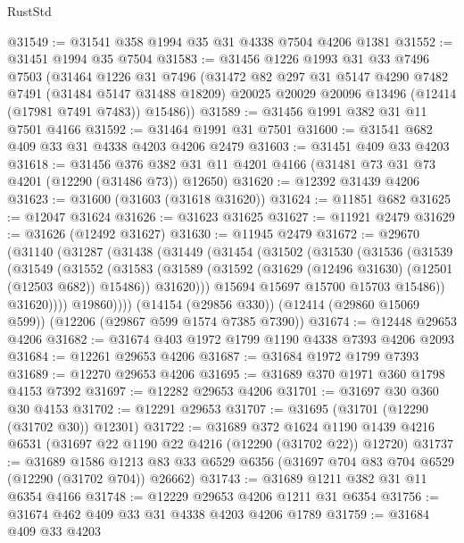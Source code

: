 \begin{lexlean}{RustStd}
\begin{coremodule}
{\begin{coremodule}
{{{{{{{{{{{{{{{{{{{{{{{{{{{{{{{{{{{{{{{{{{{{{{{{{{@31549 := @31541 @358 @1994 @35 @31 @4338 @7504 @4206 @1381
@31552 := @31451 @1994 @35 @7504
@31583 := @31456
    @1226
    @1993
    @31
    @33
    @7496
    @7503
    (@31464
      @1226
      @31
      @7496
      (@31472
        @82
        @297
        @31
        @5147
        @4290
        @7482
        @7491
        (@31484 @5147 @31488 @18209)
        @20025
        @20029
        @20096
        @13496
        (@12414 (@17981 @7491 @7483))
        @15486))
@31589 := @31456 @1991 @382 @31 @11 @7501 @4166
@31592 := @31464 @1991 @31 @7501
@31600 := @31541 @682 @409 @33 @31 @4338 @4203 @4206 @2479
@31603 := @31451 @409 @33 @4203
@31618 := @31456
    @376
    @382
    @31
    @11
    @4201
    @4166
    (@31481 @73 @31 @73 @4201 (@12290 (@31486 @73)) @12650)
@31620 := @12392 @31439 @4206
@31623 := @31600 (@31603 (@31618 @31620))
@31624 := @11851 @682
@31625 := @12047 @31624
@31626 := @31623 @31625
@31627 := @11921 @2479
@31629 := @31626 (@12492 @31627)
@31630 := @11945 @2479
@31672 := @29670
    (@31140
      (@31287
        (@31438
          (@31449
            (@31454
              (@31502
                (@31530
                  (@31536
                    (@31539
                      (@31549
                        (@31552
                          (@31583
                            (@31589
                              (@31592 (@31629 (@12496 @31630) (@12501 (@12503 @682)) @15486))
                              @31620)))
                        @15694
                        @15697
                        @15700
                        @15703
                        @15486))
                    @31620))))
            @19860))))
    (@14154 (@29856 @330))
    (@12414 (@29860 @15069 @599))
    (@12206 (@29867 @599 @1574 @7385 @7390))
@31674 := @12448 @29653 @4206
@31682 := @31674 @403 @1972 @1799 @1190 @4338 @7393 @4206 @2093
@31684 := @12261 @29653 @4206
@31687 := @31684 @1972 @1799 @7393
@31689 := @12270 @29653 @4206
@31695 := @31689 @370 @1971 @360 @1798 @4153 @7392
@31697 := @12282 @29653 @4206
@31701 := @31697 @30 @360 @30 @4153
@31702 := @12291 @29653
@31707 := @31695 (@31701 (@12290 (@31702 @30)) @12301)
@31722 := @31689
    @372
    @1624
    @1190
    @1439
    @4216
    @6531
    (@31697 @22 @1190 @22 @4216 (@12290 (@31702 @22)) @12720)
@31737 := @31689
    @1586
    @1213
    @83
    @33
    @6529
    @6356
    (@31697 @704 @83 @704 @6529 (@12290 (@31702 @704)) @26662)
@31743 := @31689 @1211 @382 @31 @11 @6354 @4166
@31748 := @12229 @29653 @4206 @1211 @31 @6354
@31756 := @31674 @462 @409 @33 @31 @4338 @4203 @4206 @1789
@31759 := @31684 @409 @33 @4203
}}}}}}}}}}}}}}}}}}}}}}}}}}}}}}}}}}}}}}}}}}}}}}}}}}
\end{coremodule}}
\end{coremodule}
\end{lexlean}
